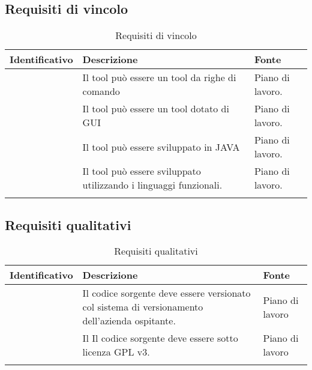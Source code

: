 \subsection{Requisiti di vincolo}\label{subsec:requisiti-vincolo}
\begin{center}
    \begin{longtable}{ | c| C{7cm} |C{3cm} |}
        \hline
        \textbf{Identificativo} & \textbf{Descrizione}                                              & \textbf{Fonte}   \\\hline
               & Il tool può essere un tool da righe di comando                   & Piano di lavoro. \\\hline
               & Il tool può essere un tool dotato di GUI                          & Piano di lavoro. \\\hline
               & Il tool può essere sviluppato in JAVA                             & Piano di lavoro. \\\hline
               & Il tool può essere sviluppato utilizzando i linguaggi funzionali. & Piano di lavoro. \\\hline
        \caption{Requisiti di vincolo}
    \end{longtable}
\end{center}
\setcounter{rowcount}{0}

\subsection{Requisiti qualitativi}\label{subsec:requisiti-qualitativi}
\begin{center}
    \begin{longtable}{ | c| C{7cm} |C{3cm} |}
        \hline
        \textbf{Identificativo} & \textbf{Descrizione}                                                                           & \textbf{Fonte}  \\\hline
               & Il codice sorgente deve essere versionato col sistema di versionamento dell'azienda ospitante. & Piano di lavoro \\\hline
               & Il Il codice sorgente deve essere sotto licenza GPL v3.                                        & Piano di lavoro \\\hline
        \caption{Requisiti qualitativi}
    \end{longtable}
\end{center}
\setcounter{subCount}{0}
\setcounter{rowcount}{0}